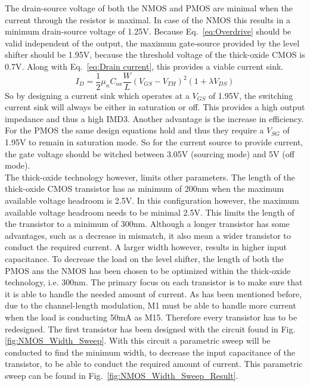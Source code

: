 The drain-source voltage of both the NMOS and PMOS are minimal when the current through the resistor is maximal. In case of the NMOS this results in a minimum drain-source voltage of 1.25V. Because Eq.~\ref{eq:Overdrive} should be valid independent of the output, the maximum gate-source provided by the level shifter should be 1.95V, because the threshold voltage of the thick-oxide CMOS is 0.7V. Along with Eq.~\ref{eq:Drain current}, this provides a viable current sink.
\begin{equation}{I_D = \frac{1}{2}\mu_n C_{ox}\frac{W}{L}(V_{GS}-V_{TH})^2(1+\lambda V_{DS})}\label{eq:Drain current}\end{equation}
So by designing a current sink which operates at a $V_{GS}$ of 1.95V, the switching current sink will always be either in saturation or off. This provides a high output impedance and thus a high IMD3. Another advantage is the increase in efficiency.\\
For the PMOS the same design equations hold and thus they require a $V_{SG}$ of 1.95V to remain in saturation mode. So for the current source to provide current, the gate voltage should be witched between 3.05V (sourcing mode) and 5V (off mode).\\  
The thick-oxide technology however, limits other parameters. The length of the thick-oxide CMOS transistor has as minimum of 200nm when the maximum available voltage headroom is 2.5V. In this configuration however, the maximum available voltage headroom needs to be minimal 2.5V. This limits the length of the transistor to a minimum of 300nm. Although a longer transistor has some advantages, such as a decrease in mismatch, it also mean a wider transistor to conduct the required current. A larger width however, results in higher input capacitance. To decrease the load on the level shifter, the length of both the PMOS ans the NMOS has been chosen to be optimized within the thick-oxide technology, i.e. 300nm.
The primary focus on each transistor is to make sure that it is able to handle the needed amount of current. As has been mentioned before, due to the channel-length modulation, M1 must be able to handle more current when the load is conducting 50mA as M15. Therefore every transistor has to be redesigned. The first transistor has been designed with the circuit found in Fig.\ref{fig:NMOS_Width_Sweep}. With this circuit a parametric sweep will be conducted to find the minimum width, to decrease the input capacitance of the transistor, to be able to conduct the required amount of current. This parametric sweep can be found in Fig.~\ref{fig:NMOS_Width_Sweep_Result}.
